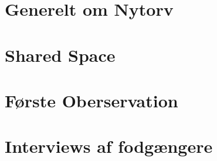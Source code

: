 \section{Generelt om Nytorv}
\label{sec:Generelt om Nytorv}

\section{Shared Space}
\label{sec:Shared Space}

\section{Første Oberservation}
\label{sec:Første Oberservation}

\section{Interviews af fodgængere}
\label{sec:Interviews af fodgængere}
